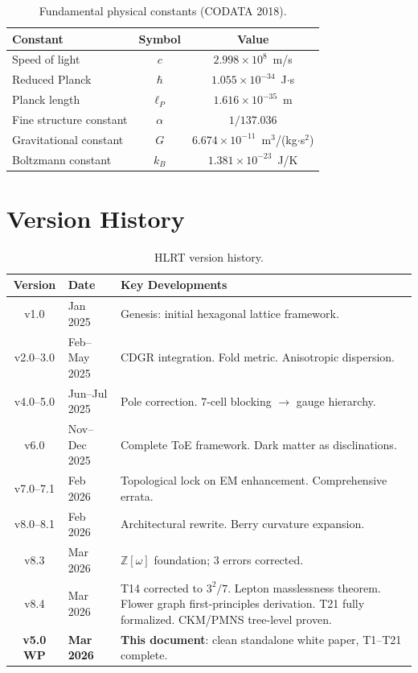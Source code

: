 \documentclass[11pt,letterpaper]{article}
\begin{document}
\begin{table}[h]
\centering
\begin{tabular}{lcc}
\toprule
\textbf{Constant} & \textbf{Symbol} & \textbf{Value} \\
\midrule
Speed of light          & $c$        & $2.998\times10^8$~m/s \\
Reduced Planck          & $\hbar$    & $1.055\times10^{-34}$~J$\cdot$s \\
Planck length           & $\ell_P$   & $1.616\times10^{-35}$~m \\
Fine structure constant & $\alpha$   & $1/137.036$ \\
Gravitational constant  & $G$        & $6.674\times10^{-11}$~m$^3$/(kg$\cdot$s$^2$) \\
Boltzmann constant      & $k_B$      & $1.381\times10^{-23}$~J/K \\
\bottomrule
\end{tabular}
\caption{Fundamental physical constants (CODATA 2018).}
\end{table}

\section{Version History}

\begin{table}[h]
\centering
\small
\begin{tabular}{clp{8.5cm}}
\toprule
\textbf{Version} & \textbf{Date} & \textbf{Key Developments} \\
\midrule
v1.0      & Jan 2025     & Genesis: initial hexagonal lattice framework. \\
v2.0--3.0 & Feb--May 2025 & CDGR integration.  Fold metric.  Anisotropic dispersion. \\
v4.0--5.0 & Jun--Jul 2025 & Pole correction.  7-cell blocking $\to$ gauge hierarchy. \\
v6.0      & Nov--Dec 2025 & Complete ToE framework.  Dark matter as disclinations. \\
v7.0--7.1 & Feb 2026     & Topological lock on EM enhancement.  Comprehensive errata. \\
v8.0--8.1 & Feb 2026     & Architectural rewrite.  Berry curvature expansion. \\
v8.3      & Mar 2026     & $\mathbb{Z}[\omega]$ foundation; 3 errors corrected. \\
v8.4      & Mar 2026     & T14 corrected to $3^2/7$.  Lepton masslessness theorem.
                           Flower graph first-principles derivation.  T21 fully
                           formalized.  CKM/PMNS tree-level proven. \\
\textbf{v5.0 WP} & \textbf{Mar 2026} & \textbf{This document}: clean standalone white paper,
                                          T1--T21 complete. \\
\bottomrule
\end{tabular}
\caption{HLRT version history.}
\end{table}
\end{document}
